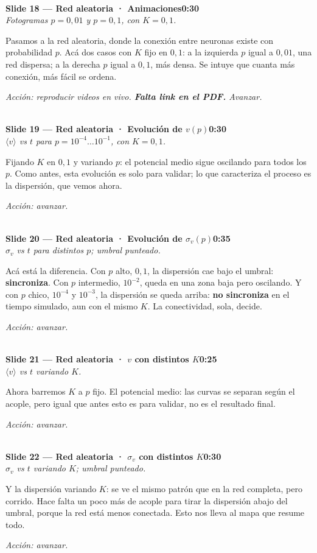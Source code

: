 \documentclass[11pt]{article}
\newcommand{\slide}[3]{%
  \vspace{6pt}%
  \noindent{\color{azulOscuro}\rule{3.2cm}{2pt}}\\[2pt]
  \noindent\textbf{\color{azulOscuro}#1}\hfill\textbf{\color{azulMedio}#3}\\[-2pt]
  {\small\color{grisTexto}\itshape #2}\\[2pt]
}
\begin{document}
\slide{Slide 18 — Red aleatoria · Animaciones}{Fotogramas $p=0{,}01$ y $p=0{,}1$, con $K=0{,}1$.}{0:30}
\begin{guion}
Pasamos a la red aleatoria, donde la conexión entre neuronas existe con probabilidad $p$. Acá dos casos con $K$ fijo en $0{,}1$: a la izquierda $p$ igual a $0{,}01$, una red dispersa; a la derecha $p$ igual a $0{,}1$, más densa. Se intuye que cuanta más conexión, más fácil se ordena.
\end{guion}
\textit{Acción: reproducir videos en vivo. \textbf{Falta link en el PDF.} Avanzar.}

\slide{Slide 19 — Red aleatoria · Evolución de $v(p)$}{$\langle v\rangle$ vs $t$ para $p=10^{-4}\dots10^{-1}$, con $K=0{,}1$.}{0:30}
\begin{guion}
Fijando $K$ en $0{,}1$ y variando $p$: el potencial medio sigue oscilando para todos los $p$. Como antes, esta evolución es solo para validar; lo que caracteriza el proceso es la dispersión, que vemos ahora.
\end{guion}
\textit{Acción: avanzar.}

\slide{Slide 20 — Red aleatoria · Evolución de $\sigma_v(p)$}{$\sigma_v$ vs $t$ para distintos $p$; umbral punteado.}{0:35}
\begin{guion}
Acá está la diferencia. Con $p$ alto, $0{,}1$, la dispersión cae bajo el umbral: \textbf{sincroniza}. Con $p$ intermedio, $10^{-2}$, queda en una zona baja pero oscilando. Y con $p$ chico, $10^{-4}$ y $10^{-3}$, la dispersión se queda arriba: \textbf{no sincroniza} en el tiempo simulado, aun con el mismo $K$. La conectividad, sola, decide.
\end{guion}
\textit{Acción: avanzar.}

\slide{Slide 21 — Red aleatoria · $v$ con distintos $K$}{$\langle v\rangle$ vs $t$ variando $K$.}{0:25}
\begin{guion}
Ahora barremos $K$ a $p$ fijo. El potencial medio: las curvas se separan según el acople, pero igual que antes esto es para validar, no es el resultado final.
\end{guion}
\textit{Acción: avanzar.}

\slide{Slide 22 — Red aleatoria · $\sigma_v$ con distintos $K$}{$\sigma_v$ vs $t$ variando $K$; umbral punteado.}{0:30}
\begin{guion}
Y la dispersión variando $K$: se ve el mismo patrón que en la red completa, pero corrido. Hace falta un poco más de acople para tirar la dispersión abajo del umbral, porque la red está menos conectada. Esto nos lleva al mapa que resume todo.
\end{guion}
\textit{Acción: avanzar.}
\end{document}
